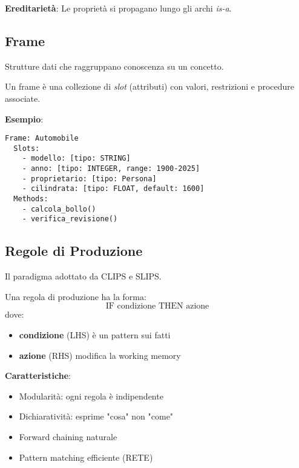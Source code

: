 \textbf{Ereditarietà}: Le proprietà si propagano lungo gli archi \textit{is-a}.

\subsection{Frame}

Strutture dati che raggruppano conoscenza su un concetto.

\begin{definizione}[Frame]
Un frame è una collezione di \textit{slot} (attributi) con valori, restrizioni e procedure associate.
\end{definizione}

\textbf{Esempio}:
\begin{verbatim}
Frame: Automobile
  Slots:
    - modello: [tipo: STRING]
    - anno: [tipo: INTEGER, range: 1900-2025]
    - proprietario: [tipo: Persona]
    - cilindrata: [tipo: FLOAT, default: 1600]
  Methods:
    - calcola_bollo()
    - verifica_revisione()
\end{verbatim}

\subsection{Regole di Produzione}

Il paradigma adottato da CLIPS e SLIPS.

\begin{definizione}
Una regola di produzione ha la forma:
\begin{equation}
\text{IF condizione THEN azione}
\end{equation}
dove:
\begin{itemize}
\item \textbf{condizione} (LHS) è un pattern sui fatti
\item \textbf{azione} (RHS) modifica la working memory
\end{itemize}
\end{definizione}

\textbf{Caratteristiche}:
\begin{itemize}
\item Modularità: ogni regola è indipendente
\item Dichiaratività: esprime "cosa" non "come"
\item Forward chaining naturale
\item Pattern matching efficiente (RETE)
\end{itemize}

